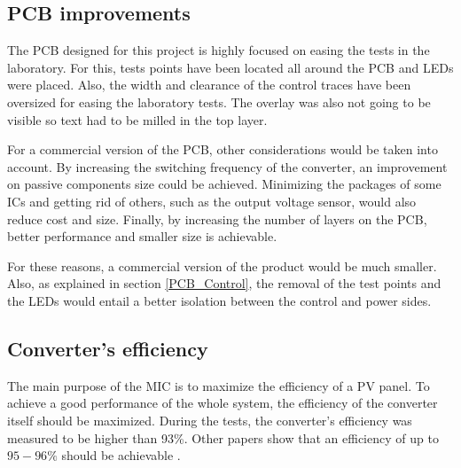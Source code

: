 \subsection{PCB improvements}
The PCB designed for this project is highly focused on easing the tests in the laboratory. For this, tests points have been located all around the PCB and LEDs were placed. Also, the width and clearance of the control traces have been oversized for easing the laboratory tests. The overlay was also not going to be visible so text had to be milled in the top layer. 

For a commercial version of the PCB, other considerations would be taken into account. By increasing the switching frequency of the converter, an improvement on passive components size could be achieved. Minimizing the packages of some ICs and getting rid of others, such as the output voltage sensor, would also reduce cost and size. Finally, by increasing the number of layers on the PCB, better performance and smaller size is achievable.

For these reasons, a commercial version of the product would be much smaller. Also, as explained in section \ref{PCB_Control}, the removal of the test points and the LEDs would entail a better isolation between the control and power sides.



\subsection{Converter's efficiency}
The main purpose of the MIC is to maximize the efficiency of a PV panel. To achieve a good performance of the whole system, the efficiency of the converter itself should be maximized. During the tests, the converter's efficiency was measured to be higher than 93\%. Other papers show that an efficiency of up to $95-96\%$ should be achievable\cite{underthehood}  \cite{efficient_buckboost}. 

